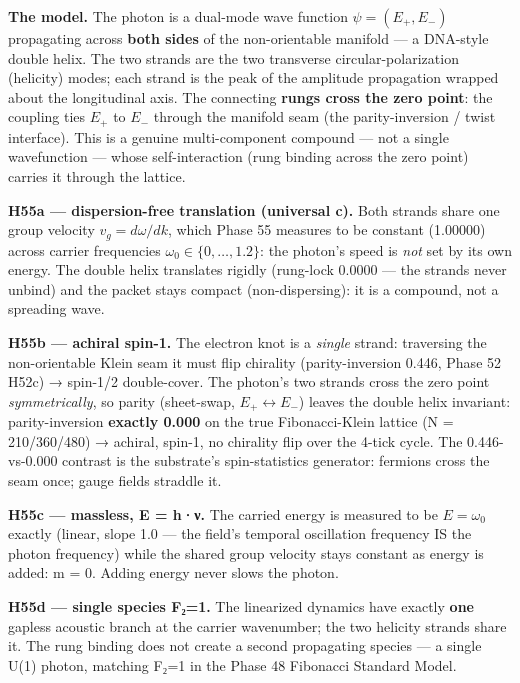 \documentclass[
]{article}
\begin{document}
\textbf{The model.} The photon is a dual-mode wave function
\(\psi = (E_+, E_-)\) propagating across \textbf{both sides} of the
non-orientable manifold --- a DNA-style double helix. The two strands
are the two transverse circular-polarization (helicity) modes; each
strand is the peak of the amplitude propagation wrapped about the
longitudinal axis. The connecting \textbf{rungs cross the zero point}:
the coupling ties \(E_+\) to \(E_-\) through the manifold seam (the
parity-inversion / twist interface). This is a genuine multi-component
compound --- not a single wavefunction --- whose self-interaction (rung
binding across the zero point) carries it through the lattice.

\textbf{H55a --- dispersion-free translation (universal c).} Both
strands share one group velocity \(v_g = d\omega/dk\), which Phase 55
measures to be constant (1.00000) across carrier frequencies
\(\omega_0 \in \{0, \dots, 1.2\}\): the photon's speed is \emph{not} set
by its own energy. The double helix translates rigidly (rung-lock 0.0000
--- the strands never unbind) and the packet stays compact
(non-dispersing): it is a compound, not a spreading wave.

\textbf{H55b --- achiral spin-1.} The electron knot is a \emph{single}
strand: traversing the non-orientable Klein seam it must flip chirality
(parity-inversion 0.446, Phase 52 H52c) → spin-1/2 double-cover. The
photon's two strands cross the zero point \emph{symmetrically}, so
parity (sheet-swap, \(E_+ \leftrightarrow E_-\)) leaves the double helix
invariant: parity-inversion \textbf{exactly 0.000} on the true
Fibonacci-Klein lattice (N = 210/360/480) → achiral, spin-1, no
chirality flip over the 4-tick cycle. The 0.446-vs-0.000 contrast is the
substrate's spin-statistics generator: fermions cross the seam once;
gauge fields straddle it.

\textbf{H55c --- massless, E = h·ν.} The carried energy is measured to
be \(E = \omega_0\) exactly (linear, slope 1.0 --- the field's temporal
oscillation frequency IS the photon frequency) while the shared group
velocity stays constant as energy is added: m = 0. Adding energy never
slows the photon.

\textbf{H55d --- single species F₂=1.} The linearized dynamics have
exactly \textbf{one} gapless acoustic branch at the carrier wavenumber;
the two helicity strands share it. The rung binding does not create a
second propagating species --- a single U(1) photon, matching F₂=1 in
the Phase 48 Fibonacci Standard Model.
\end{document}

